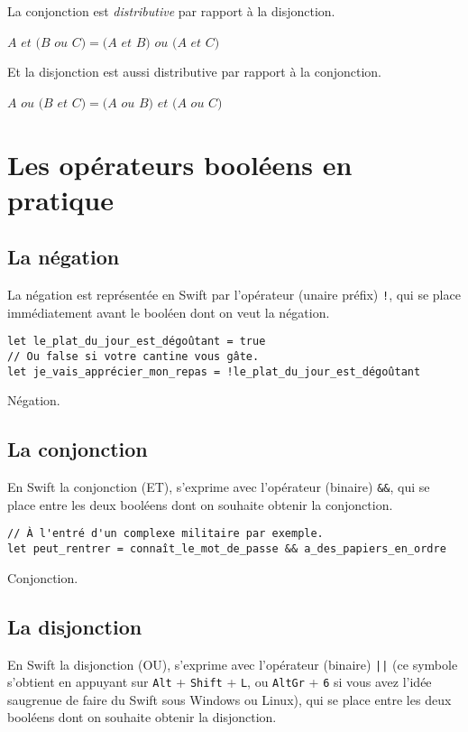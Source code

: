 La conjonction est \emph{distributive} par rapport à la disjonction.

$A$ $et$ $(B$ $ou$ $C) = (A$ $et$ $B)$ $ou$ $(A$ $et$ $C)$

Et la disjonction est aussi distributive par rapport à la conjonction.

$A$ $ou$ $(B$ $et$ $C) = (A$ $ou$ $B)$ $et$ $(A$ $ou$ $C)$

\section{Les opérateurs booléens en pratique}
\subsection{La négation}
La négation est représentée en Swift par l'opérateur (unaire préfix) \verb"!", qui se place immédiatement avant le booléen dont on veut la négation.
\begin{listing}[h]
\begin{verbatim}
let le_plat_du_jour_est_dégoûtant = true
// Ou false si votre cantine vous gâte.
let je_vais_apprécier_mon_repas = !le_plat_du_jour_est_dégoûtant
\end{verbatim}
\caption{Négation.}
\end{listing}
\subsection{La conjonction}
En Swift la conjonction (ET), s'exprime avec l'opérateur (binaire) \verb"&&", qui se place entre les deux booléens dont on souhaite obtenir la conjonction.

\begin{listing}[h]
\begin{verbatim}
// À l'entré d'un complexe militaire par exemple.
let peut_rentrer = connaît_le_mot_de_passe && a_des_papiers_en_ordre
\end{verbatim}
\caption{Conjonction.}
\end{listing}
\subsection{La disjonction}
En Swift la disjonction (OU), s'exprime avec l'opérateur (binaire) \verb"||" (ce symbole s'obtient en appuyant sur \verb"Alt" + \verb"Shift" + \verb"L", ou \verb"AltGr" + \verb"6" si vous avez l'idée saugrenue de faire du Swift sous Windows ou Linux), qui se place entre les deux booléens dont on souhaite obtenir la disjonction.

